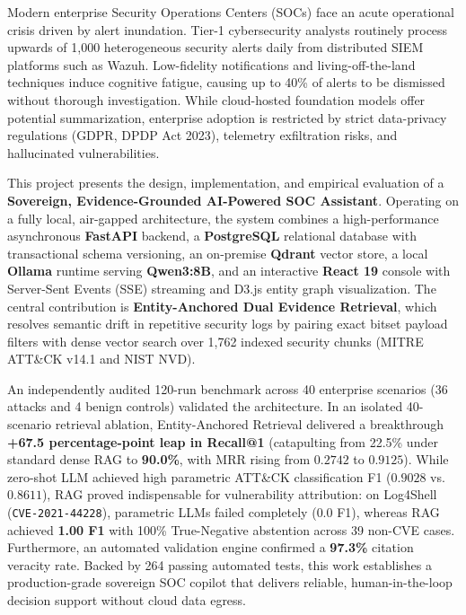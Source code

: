 \documentclass[12pt,a4paper,oneside]{report}
\begin{document}
\justifying

Modern enterprise Security Operations Centers (SOCs) face an acute operational crisis driven by alert inundation. Tier-1 cybersecurity analysts routinely process upwards of 1,000 heterogeneous security alerts daily from distributed SIEM platforms such as Wazuh. Low-fidelity notifications and living-off-the-land techniques induce cognitive fatigue, causing up to 40\% of alerts to be dismissed without thorough investigation. While cloud-hosted foundation models offer potential summarization, enterprise adoption is restricted by strict data-privacy regulations (GDPR, DPDP Act 2023), telemetry exfiltration risks, and hallucinated vulnerabilities.

This project presents the design, implementation, and empirical evaluation of a \textbf{Sovereign, Evidence-Grounded AI-Powered SOC Assistant}. Operating on a fully local, air-gapped architecture, the system combines a high-performance asynchronous \textbf{FastAPI} backend, a \textbf{PostgreSQL} relational database with transactional schema versioning, an on-premise \textbf{Qdrant} vector store, a local \textbf{Ollama} runtime serving \textbf{Qwen3:8B}, and an interactive \textbf{React 19} console with Server-Sent Events (SSE) streaming and D3.js entity graph visualization. The central contribution is \textbf{Entity-Anchored Dual Evidence Retrieval}, which resolves semantic drift in repetitive security logs by pairing exact bitset payload filters with dense vector search over 1,762 indexed security chunks (MITRE ATT\&CK v14.1 and NIST NVD).

An independently audited 120-run benchmark across 40 enterprise scenarios (36 attacks and 4 benign controls) validated the architecture. In an isolated 40-scenario retrieval ablation, Entity-Anchored Retrieval delivered a breakthrough \textbf{+67.5 percentage-point leap in Recall@1} (catapulting from 22.5\% under standard dense RAG to \textbf{90.0\%}, with MRR rising from $0.2742$ to \textbf{$0.9125$}). While zero-shot LLM achieved high parametric ATT\&CK classification F1 ($0.9028$ vs.\ $0.8611$), RAG proved indispensable for vulnerability attribution: on Log4Shell (\texttt{CVE-2021-44228}), parametric LLMs failed completely ($0.0$ F1), whereas RAG achieved \textbf{1.00 F1} with 100\% True-Negative abstention across 39 non-CVE cases. Furthermore, an automated validation engine confirmed a \textbf{97.3\%} citation veracity rate. Backed by 264 passing automated tests, this work establishes a production-grade sovereign SOC copilot that delivers reliable, human-in-the-loop decision support without cloud data egress.
\end{document}
